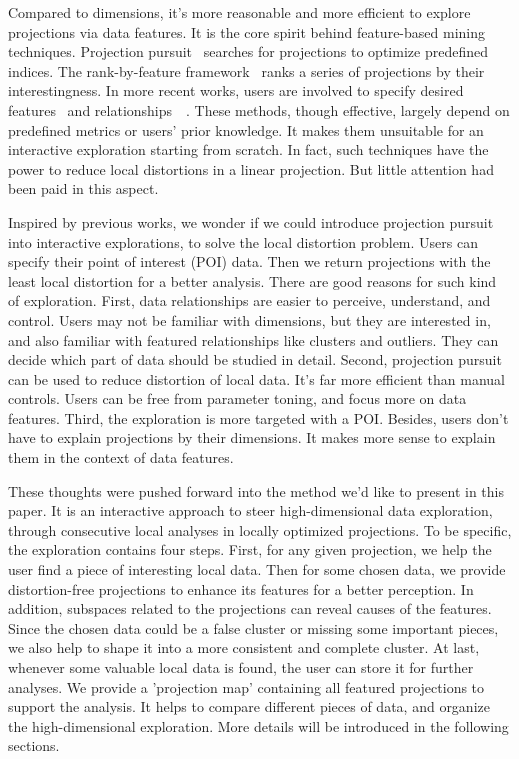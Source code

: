 Compared to dimensions, it's more reasonable and more efficient to explore projections via data features. It is the core spirit behind feature-based mining techniques. Projection pursuit~\cite{DBLP:journals/tc/FriedmanT74} searches for projections to optimize predefined indices. The rank-by-feature framework~\cite{DBLP:journals/ivs/SeoS05} ranks a series of projections by their interestingness. In more recent works, users are involved to specify desired features~\cite{DBLP:journals/tvcg/JohanssonJ09} and relationships~\cite{DBLP:journals/tvcg/HuBMHNL13}~\cite{DBLP:journals/tvcg/Gleicher13}. These methods, though effective, largely depend on predefined metrics or users' prior knowledge. It makes them unsuitable for an interactive exploration starting from scratch. In fact, such techniques have the power to reduce local distortions in a linear projection. But little attention had been paid in this aspect.

Inspired by previous works, we wonder if we could introduce projection pursuit into interactive explorations, to solve the local distortion problem. Users can specify their point of interest (POI) data. Then we return projections with the least local distortion for a better analysis. There are good reasons for such kind of exploration. First, data relationships are easier to perceive, understand, and control. Users may not be familiar with dimensions, but they are interested in, and also familiar with featured relationships like clusters and outliers. They can decide which part of data should be studied in detail. Second, projection pursuit can be used to reduce distortion of local data. It's far more efficient than manual controls. Users can be free from parameter toning, and focus more on data features. Third, the exploration is more targeted with a POI. Besides, users don't have to explain projections by their dimensions. It makes more sense to explain them in the context of data features.

These thoughts were pushed forward into the method we'd like to present in this paper. It is an interactive approach to steer high-dimensional data exploration, through consecutive local analyses in locally optimized projections. To be specific, the exploration contains four steps. First, for any given projection, we help the user find a piece of interesting local data. Then for some chosen data, we provide distortion-free projections to enhance its features for a better perception. In addition, subspaces related to the projections can reveal causes of the features. Since the chosen data could be a false cluster or missing some important pieces, we also help to shape it into a more consistent and complete cluster. At last, whenever some valuable local data is found, the user can store it for further analyses. We provide a 'projection map' containing all featured projections to support the analysis. It helps to compare different pieces of data, and organize the high-dimensional exploration. More details will be introduced in the following sections.

